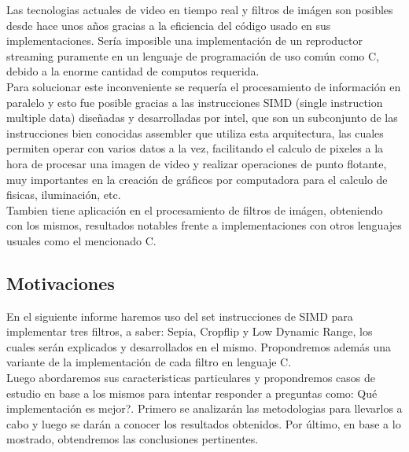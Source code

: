 Las tecnologias actuales de video en tiempo real y filtros de imágen son posibles desde hace unos años gracias a la eficiencia del código usado en sus implementaciones. Sería imposible una implementación de un reproductor streaming puramente en un lenguaje de programación de uso común como C, debido a la enorme cantidad de computos requerida.\\

Para solucionar este inconveniente se requería el procesamiento de información en paralelo y esto fue posible gracias a las instrucciones SIMD (single instruction multiple data) diseñadas y desarrolladas por intel, que son un subconjunto de las instrucciones bien conocidas assembler que utiliza esta arquitectura, las cuales permiten operar con varios datos a la vez, facilitando el calculo de pixeles a la hora de procesar una imagen de video y realizar operaciones de punto flotante, muy importantes en la creación de gráficos por computadora para el calculo de fisicas, iluminación, etc.\\
Tambien tiene aplicación en el procesamiento de filtros de imágen, obteniendo con los mismos, resultados notables frente a implementaciones con otros lenguajes usuales como el mencionado C.

\subsection{Motivaciones}

En el siguiente informe haremos uso del set instrucciones de SIMD para implementar tres filtros, a saber: Sepia, Cropflip y Low Dynamic Range, los cuales serán explicados y desarrollados en el mismo. Propondremos además una variante de la implementación de cada filtro en lenguaje C.\\

Luego abordaremos sus caracteristicas particulares y propondremos casos de estudio en base a los mismos para intentar responder a preguntas como: Qué implementación es mejor?. Primero se analizarán las metodologias para llevarlos a cabo y luego se darán a conocer los resultados obtenidos. Por último, en base a lo mostrado, obtendremos las conclusiones pertinentes.
